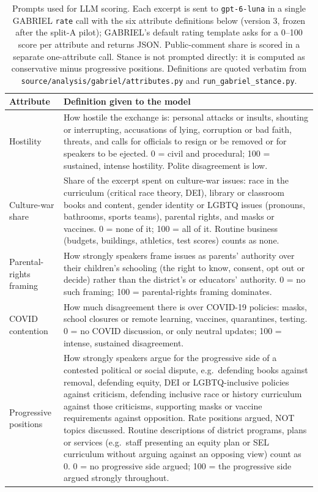 \begin{table}[H]
\centering
\small
\caption{Prompts used for LLM scoring. Each excerpt is sent to \texttt{gpt-6-luna} in a single GABRIEL \texttt{rate} call with the six attribute definitions below (version 3, frozen after the split-A pilot); GABRIEL's default rating template asks for a 0--100 score per attribute and returns JSON. Public-comment share is scored in a separate one-attribute call. Stance is not prompted directly: it is computed as conservative minus progressive positions. Definitions are quoted verbatim from \texttt{source/analysis/gabriel/attributes.py} and \texttt{run\_gabriel\_stance.py}.}
\label{tab:llm-prompts}
\begin{tabularx}{\linewidth}{@{}p{2.9cm}X@{}}
\toprule
Attribute & Definition given to the model \\
\midrule
Hostility & How hostile the exchange is: personal attacks or insults, shouting or interrupting, accusations of lying, corruption or bad faith, threats, and calls for officials to resign or be removed or for speakers to be ejected. 0 = civil and procedural; 100 = sustained, intense hostility. Polite disagreement is low. \\[3pt]
Culture-war share & Share of the excerpt spent on culture-war issues: race in the curriculum (critical race theory, DEI), library or classroom books and content, gender identity or LGBTQ issues (pronouns, bathrooms, sports teams), parental rights, and masks or vaccines. 0 = none of it; 100 = all of it. Routine business (budgets, buildings, athletics, test scores) counts as none. \\[3pt]
Parental-rights framing & How strongly speakers frame issues as parents' authority over their children's schooling (the right to know, consent, opt out or decide) rather than the district's or educators' authority. 0 = no such framing; 100 = parental-rights framing dominates. \\[3pt]
COVID contention & How much disagreement there is over COVID-19 policies: masks, school closures or remote learning, vaccines, quarantines, testing. 0 = no COVID discussion, or only neutral updates; 100 = intense, sustained disagreement. \\[3pt]
Progressive positions & How strongly speakers argue for the progressive side of a contested political or social dispute, e.g.\ defending books against removal, defending equity, DEI or LGBTQ-inclusive policies against criticism, defending inclusive race or history curriculum against those criticisms, supporting masks or vaccine requirements against opposition. Rate positions argued, NOT topics discussed. Routine descriptions of district programs, plans or services (e.g.\ staff presenting an equity plan or SEL curriculum without arguing against an opposing view) count as 0. 0 = no progressive side argued; 100 = the progressive side argued strongly throughout. \\[3pt]

\end{tabularx}
\end{table}
